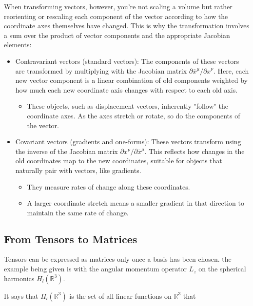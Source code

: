 When transforming vectors, however, you're not scaling a volume but rather reorienting or rescaling each component
of the vector according to how the coordinate axes themselves have changed.
This is why the transformation involves a sum over the product of vector components and the appropriate Jacobian elements:

\begin{itemize}
\item Contravariant vectors (standard vectors): The components of these vectors are transformed by multiplying with the
    Jacobian matrix $\partial \overline{x}^\mu / \partial x^\nu$. Here, each new vector component is a linear combination
    of old components weighted by how much each new coordinate axis changes with respect to each old axis.
    \begin{itemize}
        \item These objects, such as displacement vectors, inherently "follow" the coordinate axes. As the axes stretch
        or rotate, so do the components of the vector. 
    \end{itemize}
\item Covariant vectors (gradients and one-forms): These vectors transform using the inverse of the Jacobian matrix
    $\partial x^\nu / \partial \overline{x}^\mu$. This reflects how changes in the old coordinates map to the new
    coordinates, suitable for objects that naturally pair with vectors, like gradients.
    \begin{itemize}
        \item They measure rates of change along these coordinates.
        \item A larger coordinate stretch means a smaller gradient in that direction to maintain the same rate of change.
    \end{itemize}
\end{itemize}




\subsection{From Tensors to Matrices}

Tensors can be expressed as matrices only once a basis has been chosen.
the example being given is with the angular momentum operator $L_z$ on the spherical harmonics $H_l (\mathbb{R}^3)$.

It says that $H_l (\mathbb{R}^3)$ is the set of all linear functions on $\mathbb{R}^3$ that

